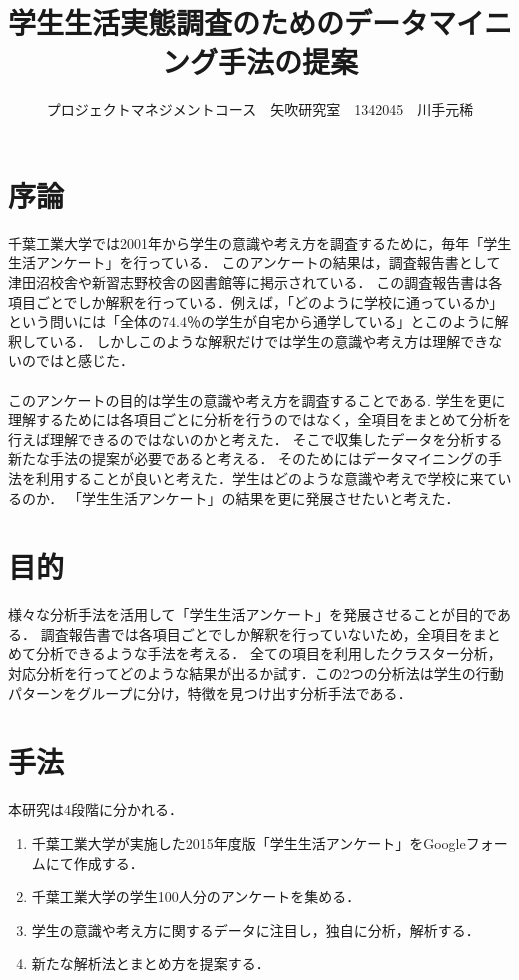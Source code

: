 \documentclass[uplatex,twocolumn,dvipdfmx]{jsarticle}
\title{\vspace{-5mm}\fontsize{14pt}{0pt}\selectfont 学生生活実態調査のためのデータマイニング手法の提案}
\author{\normalsize プロジェクトマネジメントコース　矢吹研究室　1342045　川手元稀}
\date{}
\begin{document}
\fontsize{10.5pt}{\baselineskip}\selectfont
\maketitle





\section{序論}
千葉工業大学では2001年から学生の意識や考え方を調査するために，毎年「学生生活アンケート」を行っている．
このアンケートの結果は，調査報告書として津田沼校舎や新習志野校舎の図書館等に掲示されている．
この調査報告書は各項目ごとでしか解釈を行っている．例えば，「どのように学校に通っているか」という問いには「全体の74.4％の学生が自宅から通学している」とこのように解釈している．
しかしこのような解釈だけでは学生の意識や考え方は理解できないのではと感じた．
\\\\このアンケートの目的は学生の意識や考え方を調査することである\cite{a}.
学生を更に理解するためには各項目ごとに分析を行うのではなく，全項目をまとめて分析を行えば理解できるのではないのかと考えた．
そこで収集したデータを分析する新たな手法の提案が必要であると考える．
そのためにはデータマイニングの手法を利用することが良いと考えた．学生はどのような意識や考えで学校に来ているのか．
「学生生活アンケート」の結果を更に発展させたいと考えた．


\section{目的}
様々な分析手法を活用して「学生生活アンケート」を発展させることが目的である．
調査報告書では各項目ごとでしか解釈を行っていないため，全項目をまとめて分析できるような手法を考える．
全ての項目を利用したクラスター分析，対応分析を行ってどのような結果が出るか試す．この2つの分析法は学生の行動パターンをグループに分け，特徴を見つけ出す分析手法である\cite{b}．


\section{手法}
本研究は4段階に分かれる．

\begin{enumerate}
\item 千葉工業大学が実施した2015年度版「学生生活アンケート」をGoogleフォームにて作成する．
\item 千葉工業大学の学生100人分のアンケートを集める．
\item 学生の意識や考え方に関するデータに注目し，独自に分析，解析する．
\item 新たな解析法とまとめ方を提案する．
\end{enumerate}
\end{document}
